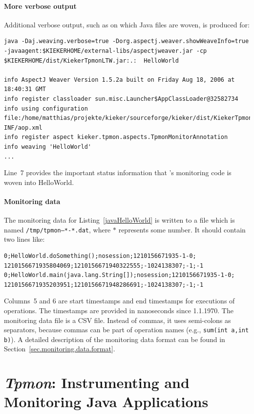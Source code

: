\documentclass[a4paper,12pt]{scrartcl}
\begin{document}
\paragraph{More verbose output}
Additional verbose output, such as on which Java files are woven, is produced for:
\begin{lstlisting}[caption={Verbose execution with AspectJ's Java agent.},label={lst2}]
java -Daj.weaving.verbose=true -Dorg.aspectj.weaver.showWeaveInfo=true -javaagent:$KIEKERHOME/external-libs/aspectjweaver.jar -cp $KIEKERHOME/dist/KiekerTpmonLTW.jar:.:  HelloWorld

info AspectJ Weaver Version 1.5.2a built on Friday Aug 18, 2006 at 18:40:31 GMT
info register classloader sun.misc.Launcher$AppClassLoader@32582734
info using configuration file:/home/matthias/projekte/kieker/sourceforge/kieker/dist/KiekerTpmonLTW.jar!/META-INF/aop.xml
info register aspect kieker.tpmon.aspects.TpmonMonitorAnnotation
info weaving 'HelloWorld'
...
\end{lstlisting}
Line~7 provides the important status information that \tpmon's monitoring code is woven into HelloWorld.



\paragraph{Monitoring data}
The monitoring data for Listing~\ref{javaHelloWorld} is written to a file which is named \texttt{/tmp/tpmon--*-*.dat}, where $*$ represents some number. It should contain two lines like:
\begin{lstlisting}[caption={Example monitoring data},label={OutputHelloWorld2}]
0;HelloWorld.doSomething();nosession;1210156671935-1-0; 1210156671935804069;1210156671940322555;-1024138307;-1;-1
0;HelloWorld.main(java.lang.String[]);nosession;1210156671935-1-0; 1210156671935203951;1210156671948286691;-1024138307;-1;-1
\end{lstlisting}

Columns~5 and 6 are start timestamps and end timestamps for executions of operations. The timestamps are provided in nanoseconds since 1.1.1970. The monitoring data file is a CSV file. Instead of commas, it uses semi-colons as separators, because commas can be part of operation names (e.g., \texttt{sum(int a,int b)}). A detailed description of the monitoring data format can be found in Section~\ref{sec.monitoring.data.format}.

\section{\textit{Tpmon}: Instrumenting and Monitoring Java Applications}\label{sec.tpmon}
\end{document}
